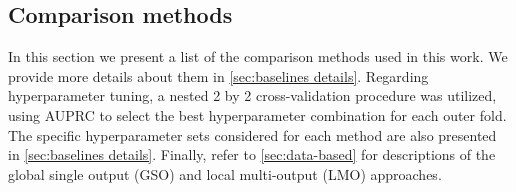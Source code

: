 \documentclass[sn-mathphys-num]{sn-jnl}%
\theoremstyle{thmstyleone}%
\theoremstyle{thmstyletwo}%
\theoremstyle{thmstylethree}%
\begin{document}




\subsection{Comparison methods}
\label{sec:baselines}

In this section we present a list of the comparison methods used in this work. We provide more details about them in \autoref{sec:baselines details}.
Regarding hyperparameter tuning, a nested 2 by 2 cross-validation procedure was utilized, using AUPRC to select the best hyperparameter combination for each outer fold.
The specific hyperparameter sets considered for each method are also presented in \autoref{sec:baselines details}. Finally, refer to \autoref{sec:data-based} for descriptions of the global single output (GSO) and local multi-output (LMO) approaches.
\end{document}
